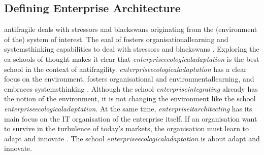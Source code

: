 \subsection{Defining Enterprise Architecture}
\label{sub:definingea}
\Gls{antifragile} deals with \glspl{stressor} and \glspl{blackswan} originating from the (environment of the) system of interest. The \acrlong{eaal} of \textcite{Botjes2021} fosters \gls{organisationallearning} and \gls{systemsthinking} capabilities to deal with \glspl{stressor} and \glspl{blackswan} \parencite[pp.~2--4]{Botjes2021}. Exploring the \acrlong{ea} schools of thought \parencite{Lapalme2012} makes it clear that \textit{\gls{enterpriseecologicaladaptation}} is the best school in the context of \gls{antifragility}. \textit{\gls{enterpriseecologicaladaptation}} has a clear focus on the environment, fosters organisational and \gls{environmentallearning}, and embraces \gls{systemsthinking} \parencite[pp.~40--41]{Lapalme2012}. Although the school \textit{\gls{enterpriseintegrating}} already has the notion of the environment, it is not changing the environment like the school \textit{\gls{enterpriseecologicaladaptation}}. At the same time, \textit{\gls{enterpriseitarchitecting}} has its main focus on the IT organisation of the enterprise itself. If an organisation want to survive in the turbulence of today's markets, the organisation must learn to adapt and innovate \parencite[p.~42]{Lapalme2012}. The school \textit{\gls{enterpriseecologicaladaptation}} is about adapt and innovate.

